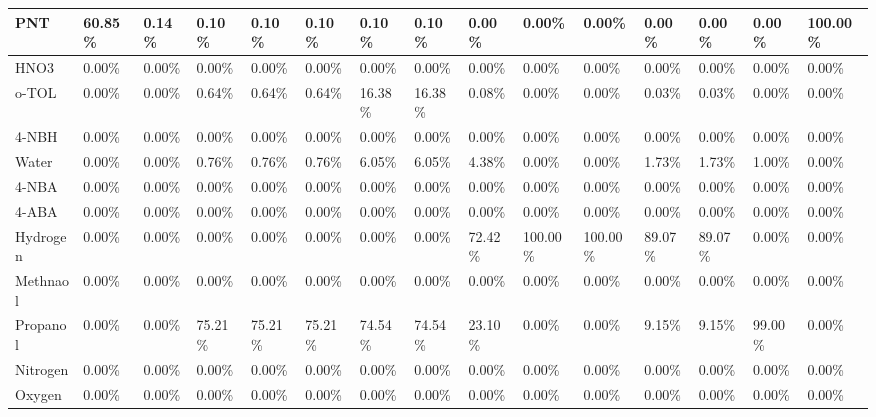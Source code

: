 \begin{landscape}
\begin{table}[H]
\begin{tabular}{|l|l|l|l|l|l|l|l|l|l|l|l|l|l|l|}
PNT                     & 60.85\% & 0.14\%  & 0.10\%  & 0.10\%  & 0.10\%  & 0.10\%  & 0.10\%  & 0.00\%  & 0.00\%   & 0.00\%   & 0.00\%  & 0.00\%  & 0.00\%  & 100.00\% \\ \hline
HNO3                    & 0.00\%  & 0.00\%  & 0.00\%  & 0.00\%  & 0.00\%  & 0.00\%  & 0.00\%  & 0.00\%  & 0.00\%   & 0.00\%   & 0.00\%  & 0.00\%  & 0.00\%  & 0.00\%   \\ \hline
o-TOL                   & 0.00\%  & 0.00\%  & 0.64\%  & 0.64\%  & 0.64\%  & 16.38\% & 16.38\% & 0.08\%  & 0.00\%   & 0.00\%   & 0.03\%  & 0.03\%  & 0.00\%  & 0.00\%   \\ \hline
4-NBH                   & 0.00\%  & 0.00\%  & 0.00\%  & 0.00\%  & 0.00\%  & 0.00\%  & 0.00\%  & 0.00\%  & 0.00\%   & 0.00\%   & 0.00\%  & 0.00\%  & 0.00\%  & 0.00\%   \\ \hline
Water                   & 0.00\%  & 0.00\%  & 0.76\%  & 0.76\%  & 0.76\%  & 6.05\%  & 6.05\%  & 4.38\%  & 0.00\%   & 0.00\%   & 1.73\%  & 1.73\%  & 1.00\%  & 0.00\%   \\ \hline
4-NBA                   & 0.00\%  & 0.00\%  & 0.00\%  & 0.00\%  & 0.00\%  & 0.00\%  & 0.00\%  & 0.00\%  & 0.00\%   & 0.00\%   & 0.00\%  & 0.00\%  & 0.00\%  & 0.00\%   \\ \hline
4-ABA                   & 0.00\%  & 0.00\%  & 0.00\%  & 0.00\%  & 0.00\%  & 0.00\%  & 0.00\%  & 0.00\%  & 0.00\%   & 0.00\%   & 0.00\%  & 0.00\%  & 0.00\%  & 0.00\%   \\ \hline
Hydrogen                & 0.00\%  & 0.00\%  & 0.00\%  & 0.00\%  & 0.00\%  & 0.00\%  & 0.00\%  & 72.42\% & 100.00\% & 100.00\% & 89.07\% & 89.07\% & 0.00\%  & 0.00\%   \\ \hline
Methnaol                & 0.00\%  & 0.00\%  & 0.00\%  & 0.00\%  & 0.00\%  & 0.00\%  & 0.00\%  & 0.00\%  & 0.00\%   & 0.00\%   & 0.00\%  & 0.00\%  & 0.00\%  & 0.00\%   \\ \hline
Propanol                & 0.00\%  & 0.00\%  & 75.21\% & 75.21\% & 75.21\% & 74.54\% & 74.54\% & 23.10\% & 0.00\%   & 0.00\%   & 9.15\%  & 9.15\%  & 99.00\% & 0.00\%   \\ \hline
Nitrogen                & 0.00\%  & 0.00\%  & 0.00\%  & 0.00\%  & 0.00\%  & 0.00\%  & 0.00\%  & 0.00\%  & 0.00\%   & 0.00\%   & 0.00\%  & 0.00\%  & 0.00\%  & 0.00\%   \\ \hline
Oxygen                  & 0.00\%  & 0.00\%  & 0.00\%  & 0.00\%  & 0.00\%  & 0.00\%  & 0.00\%  & 0.00\%  & 0.00\%   & 0.00\%   & 0.00\%  & 0.00\%  & 0.00\%  & 0.00\%   \\ \hline

\end{tabular}
\end{table}
\end{landscape}
